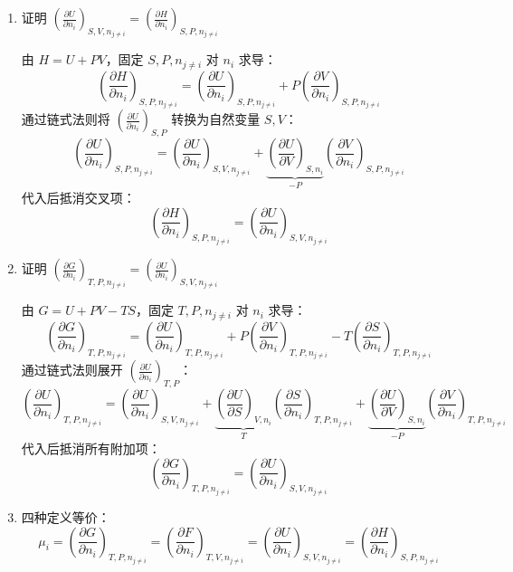 \begin{add}
\begin{enumerate}
\item 证明 \(\left( \frac{\partial U}{\partial n_i} \right)_{S, V, n_{j \neq i}} 
= \left( \frac{\partial H}{\partial n_i} \right)_{S, P, n_{j \neq i}}\)

由 \(H = U + PV\)，固定 \(S, P, n_{j \neq i}\) 对 \(n_i\) 求导：
\[
\left( \frac{\partial H}{\partial n_i} \right)_{S, P, n_{j \neq i}} 
= \left( \frac{\partial U}{\partial n_i} \right)_{S, P, n_{j \neq i}} 
+ P \left( \frac{\partial V}{\partial n_i} \right)_{S, P, n_{j \neq i}}
\]
通过链式法则将 \(\left( \frac{\partial U}{\partial n_i} \right)_{S, P}\) 转换为自然变量 \(S, V\)：
\[
\left( \frac{\partial U}{\partial n_i} \right)_{S, P, n_{j \neq i}} 
= \left( \frac{\partial U}{\partial n_i} \right)_{S, V, n_{j \neq i}} 
+ \underbrace{\left( \frac{\partial U}{\partial V} \right)_{S, n_i}}_{-P} \left( \frac{\partial V}{\partial n_i} \right)_{S, P, n_{j \neq i}}
\]
代入后抵消交叉项：
\[
\left( \frac{\partial H}{\partial n_i} \right)_{S, P, n_{j \neq i}} 
= \left( \frac{\partial U}{\partial n_i} \right)_{S, V, n_{j \neq i}}
\]

\item 证明 \(\left( \frac{\partial G}{\partial n_i} \right)_{T, P, n_{j \neq i}} 
= \left( \frac{\partial U}{\partial n_i} \right)_{S, V, n_{j \neq i}}\)

由 \(G = U + PV - TS\)，固定 \(T, P, n_{j \neq i}\) 对 \(n_i\) 求导：
\[
\left( \frac{\partial G}{\partial n_i} \right)_{T, P, n_{j \neq i}} 
= \left( \frac{\partial U}{\partial n_i} \right)_{T, P, n_{j \neq i}} 
+ P \left( \frac{\partial V}{\partial n_i} \right)_{T, P, n_{j \neq i}} 
- T \left( \frac{\partial S}{\partial n_i} \right)_{T, P, n_{j \neq i}}
\]
通过链式法则展开 \(\left( \frac{\partial U}{\partial n_i} \right)_{T, P}\)：
\[
\left( \frac{\partial U}{\partial n_i} \right)_{T, P, n_{j \neq i}} 
= \left( \frac{\partial U}{\partial n_i} \right)_{S, V, n_{j \neq i}} 
+ \underbrace{\left( \frac{\partial U}{\partial S} \right)_{V, n_i}}_{T} 
\left( \frac{\partial S}{\partial n_i} \right)_{T, P, n_{j \neq i}} 
+ \underbrace{\left( \frac{\partial U}{\partial V} \right)_{S, n_i}}_{-P} 
\left( \frac{\partial V}{\partial n_i} \right)_{T, P, n_{j \neq i}}
\]
代入后抵消所有附加项：
\[
\left( \frac{\partial G}{\partial n_i} \right)_{T, P, n_{j \neq i}} 
= \left( \frac{\partial U}{\partial n_i} \right)_{S, V, n_{j \neq i}}
\]

\item 四种定义等价：
\[
\mu_i = \left( \frac{\partial G}{\partial n_i} \right)_{T, P, n_{j \neq i}} 
= \left( \frac{\partial F}{\partial n_i} \right)_{T, V, n_{j \neq i}} 
= \left( \frac{\partial U}{\partial n_i} \right)_{S, V, n_{j \neq i}} 
= \left( \frac{\partial H}{\partial n_i} \right)_{S, P, n_{j \neq i}}
\]
\end{enumerate}
\end{add}
